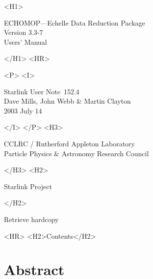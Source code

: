 \documentclass[twoside,11pt]{article}
\newcommand{\stardoccategory}  {Starlink User Note}
\newcommand{\stardocsource}    {sun\stardocnumber}
\newcommand{\stardocnumber}    {152.4}
\newcommand{\stardocauthors}   {Dave Mills, John Webb \& Martin Clayton}
\newcommand{\stardocdate}      {2003 July 14}
\newcommand{\stardoctitle}     {ECHOMOP---Echelle Data Reduction Package}
\newcommand{\stardocversion}   {Version 3.3-7} %
\newcommand{\stardocmanual}    {Users' Manual}
\newcommand{\htmladdnormallink}[2]{#1}
\newcommand{\htmladdimg}[1]{}
\newcommand{\htmlref}[2]{#1}
\newcommand{\htmladdtonavigation}[1]{}
\newcommand{\xlabel}[1]{}
\renewcommand{\_}{\texttt{\symbol{95}}}
\begin{document}
\begin{htmlonly}
   \xlabel{}
   \begin{rawhtml} <H1> \end{rawhtml}
      \stardoctitle\\
      \stardocversion\\
      \stardocmanual
   \begin{rawhtml} </H1> <HR> \end{rawhtml}


   \begin{rawhtml} <P> <I> \end{rawhtml}
   \stardoccategory\ \stardocnumber \\
   \stardocauthors \\
   \stardocdate
   \begin{rawhtml} </I> </P> <H3> \end{rawhtml}
      \htmladdnormallink{CCLRC / Rutherford Appleton Laboratory}
                        {http://www.cclrc.ac.uk} \\
      \htmladdnormallink{Particle Physics \& Astronomy Research Council}
                        {http://www.pparc.ac.uk} \\
   \begin{rawhtml} </H3> <H2> \end{rawhtml}
      \htmladdnormallink{Starlink Project}{http://www.starlink.ac.uk/}
   \begin{rawhtml} </H2> \end{rawhtml}
   \htmladdnormallink{\htmladdimg{source.gif} Retrieve hardcopy}
      {http://www.starlink.ac.uk/cgi-bin/hcserver?\stardocsource}\\

  \label{stardoccontents}
  \begin{rawhtml}
    <HR>
    <H2>Contents</H2>
  \end{rawhtml}
  \htmladdtonavigation{\htmlref{\htmladdimg{contents_motif.gif}}
        {stardoccontents}}

  \section{\xlabel{abstract}Abstract}
\end{htmlonly}
\end{document}
